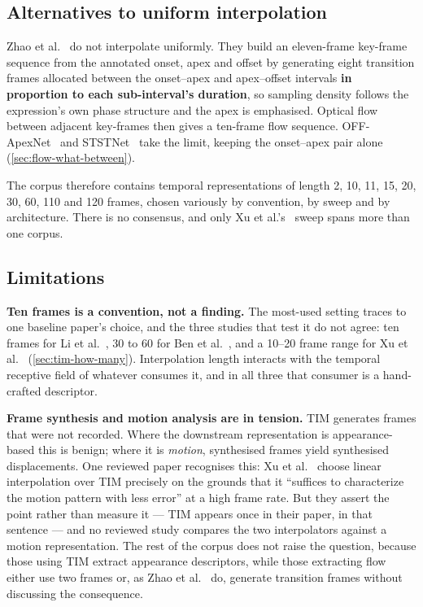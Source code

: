 \subsection{Alternatives to uniform interpolation}
\label{sec:tim-keyframe}

Zhao et al.~\cite{zhaoS2021} do not interpolate uniformly. They build an eleven-frame key-frame sequence from the annotated onset, apex and offset by generating eight transition frames allocated between the onset--apex and apex--offset intervals \textbf{in proportion to each sub-interval's duration}, so sampling density follows the expression's own phase structure and the apex is emphasised. Optical flow between adjacent key-frames then gives a ten-frame flow sequence. OFF-ApexNet~\cite{liong2019a} and STSTNet~\cite{liong2019b} take the limit, keeping the onset--apex pair alone (\autoref{sec:flow-what-between}).

The corpus therefore contains temporal representations of length 2, 10, 11, 15, 20, 30, 60, 110 and 120 frames, chosen variously by convention, by sweep and by architecture. There is no consensus, and only Xu et al.'s~\cite{xu2017} sweep spans more than one corpus.

\subsection{Limitations}
\label{sec:tim-limitations}

\textbf{Ten frames is a convention, not a finding.} The most-used setting traces to one baseline paper's choice, and the three studies that test it do not agree: ten frames for Li et al.~\cite{liX2018}, 30 to 60 for Ben et al.~\cite{ben2021}, and a 10--20 frame range for Xu et al.~\cite{xu2017} (\autoref{sec:tim-how-many}). Interpolation length interacts with the temporal receptive field of whatever consumes it, and in all three that consumer is a hand-crafted descriptor.

\textbf{Frame synthesis and motion analysis are in tension.} TIM generates frames that were not recorded. Where the downstream representation is appearance-based this is benign; where it is \textit{motion}, synthesised frames yield synthesised displacements. One reviewed paper recognises this: Xu et al.~\cite{xu2017} choose linear interpolation over TIM precisely on the grounds that it ``suffices to characterize the motion pattern with less error'' at a high frame rate. But they assert the point rather than measure it --- TIM appears once in their paper, in that sentence --- and no reviewed study compares the two interpolators against a motion representation. The rest of the corpus does not raise the question, because those using TIM extract appearance descriptors, while those extracting flow either use two frames or, as Zhao et al.~\cite{zhaoS2021} do, generate transition frames without discussing the consequence.

